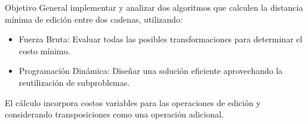 Objetivo General implementar y analizar dos algoritmos que calculen la distancia mínima de edición entre dos cadenas, utilizando:

\begin{itemize}
\item Fuerza Bruta: Evaluar todas las posibles transformaciones para determinar el costo mínimo.
\item Programación Dinámica: Diseñar una solución eficiente aprovechando la reutilización de subproblemas.
\end{itemize}
El cálculo incorpora costos variables para las operaciones de edición y considerando transposiciones como una operación adicional.

